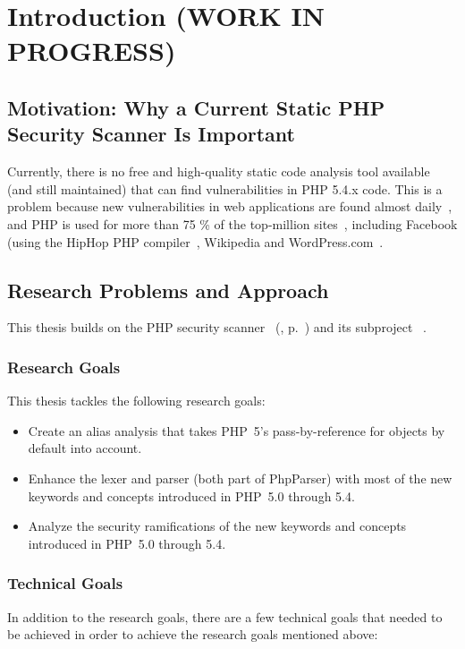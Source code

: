 \chapter{Introduction (WORK IN PROGRESS)}

\section{Motivation: Why a Current Static PHP Security Scanner Is Important}
Currently, there is no free and high-quality static code analysis tool available (and still maintained) that can find vulnerabilities in PHP 5.4.x code. This is a problem because new vulnerabilities in web applications are found almost daily~\cite{osvdb}, and PHP is used for more than 75 \% of the top-million sites~\cite{w3techs-php-usage}, including Facebook (using the HipHop PHP compiler~\cite{hiphop}, Wikipedia and WordPress.com~\cite{w3techs-php-sites}.

\section{Research Problems and Approach}

This thesis builds on the PHP security scanner ~(\cite{pixy}, p.~\pageref{pixy}) and its subproject ~\cite{phpparser}.

\subsection{Research Goals}

This thesis tackles the following research goals:

\begin{itemize}
 \item Create an alias analysis that takes PHP~5's pass-by-reference for objects by default into account.
 \item Enhance the lexer and parser (both part of PhpParser) with most of the new keywords and concepts introduced in PHP~5.0 through 5.4.
 \item Analyze the security ramifications of the new keywords and concepts introduced in PHP~5.0 through 5.4.
\end{itemize}

\subsection{Technical Goals}

In addition to the research goals, there are a few technical goals that needed to be achieved in order to achieve the research goals mentioned above:

